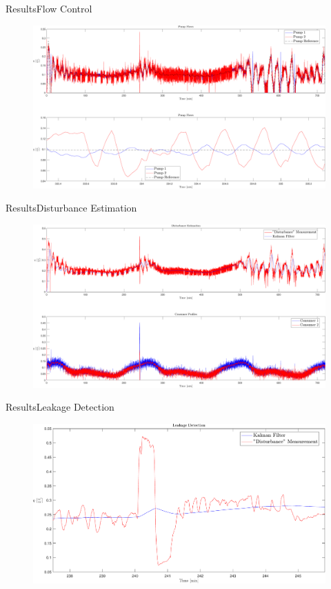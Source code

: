\begin{frame}{Results}{Flow Control}
	\begin{figure}[h!]
		\includegraphics[width=\linewidth]{Graphics/InnerLoop.pdf}
		\label{fig:InnerLoop}
	\end{figure}
\end{frame}

\begin{frame}{Results}{Disturbance Estimation}
	\begin{figure}[h!]
		\includegraphics[width=\linewidth]{Graphics/DisturbanceEstimation.pdf}
		\label{fig:DisturbanceEstimation}
	\end{figure}
\end{frame}

\begin{frame}{Results}{Leakage Detection}
	\begin{figure}[h!]
		\includegraphics[width=\linewidth]{Graphics/LeakageDetection.pdf}
		\label{fig:LeakageDetection}
	\end{figure}
\end{frame}

